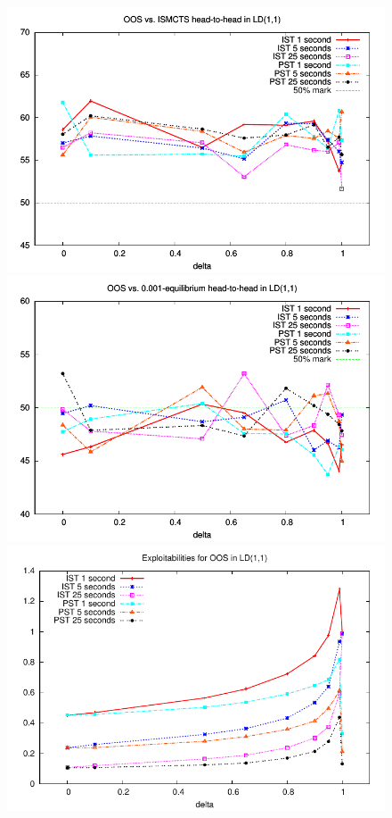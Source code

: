 \documentclass[letterpaper]{article}
\begin{document}
\begin{figure}[t!]
\begin{center}
\includegraphics[scale=0.5]{plots/ismcts-oos-perf} \\
\includegraphics[scale=0.5]{plots/eq-oos-perf} \\
\includegraphics[scale=0.5]{plots/oos-expl} \\

\end{center}
\end{figure}
\end{document}
